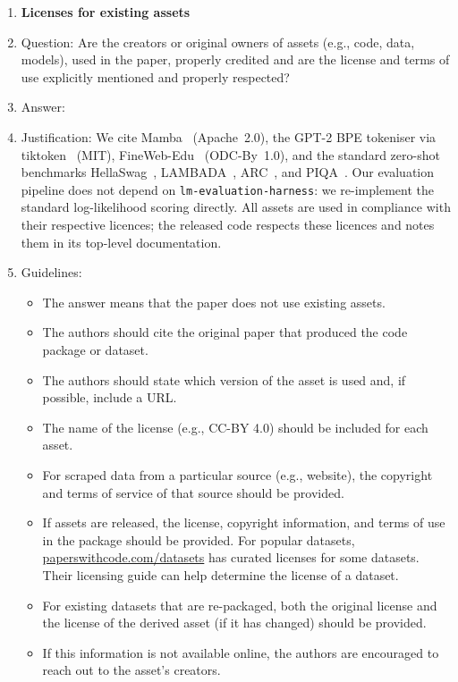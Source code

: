 \begin{enumerate}
\item {\bf Licenses for existing assets}
    \item[] Question: Are the creators or original owners of assets (e.g., code, data, models), used in the paper, properly credited and are the license and terms of use explicitly mentioned and properly respected?
    \item[] Answer: \answerYes{}
    \item[] Justification: We cite Mamba~\citep{gu2023mamba} (Apache~2.0), the GPT-2 BPE tokeniser via tiktoken~\citep{radford2019language} (MIT), FineWeb-Edu~\citep{lozhkov2024fineweb} (ODC-By~1.0), and the standard zero-shot benchmarks HellaSwag~\citep{zellers2019hellaswag}, LAMBADA~\citep{paperno2016lambada}, ARC~\citep{clark2018think}, and PIQA~\citep{bisk2020piqa}. Our evaluation pipeline does not depend on \texttt{lm-evaluation-harness}: we re-implement the standard log-likelihood scoring directly. All assets are used in compliance with their respective licences; the released code respects these licences and notes them in its top-level documentation.
    \item[] Guidelines:
    \begin{itemize}
        \item The answer \answerNA{} means that the paper does not use existing assets.
        \item The authors should cite the original paper that produced the code package or dataset.
        \item The authors should state which version of the asset is used and, if possible, include a URL.
        \item The name of the license (e.g., CC-BY 4.0) should be included for each asset.
        \item For scraped data from a particular source (e.g., website), the copyright and terms of service of that source should be provided.
        \item If assets are released, the license, copyright information, and terms of use in the package should be provided. For popular datasets, \url{paperswithcode.com/datasets} has curated licenses for some datasets. Their licensing guide can help determine the license of a dataset.
        \item For existing datasets that are re-packaged, both the original license and the license of the derived asset (if it has changed) should be provided.
        \item If this information is not available online, the authors are encouraged to reach out to the asset's creators.
    \end{itemize}


\end{enumerate}
